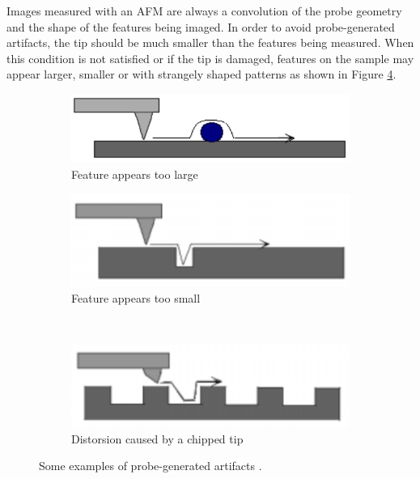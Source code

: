 \documentclass[11pt,a4paper]{article}
\begin{document}
Images measured with an AFM are always a convolution of the probe geometry and the shape of the features being imaged. In order to avoid probe-generated artifacts, the tip should be much smaller than the features being measured. When this condition is not satisfied or if the tip is damaged, features on the sample may appear larger, smaller or with strangely shaped patterns as shown in Figure \ref{fig:artifacts_probe}.

\begin{figure}[H]
\centering
\begin{subfigure}[b]{0.45\textwidth}
\includegraphics[width=\textwidth]{artifacts_probe_1}
\caption{Feature appears too large}
\label{fig:artifacts_probe_1}
\end{subfigure}
\begin{subfigure}[b]{0.45\textwidth}
\includegraphics[width=\textwidth]{artifacts_probe_2}
\caption{Feature appears too small}
\label{fig:artifacts_probe_2}
\end{subfigure}\\\vspace{.2cm}
\begin{subfigure}[b]{0.45\textwidth}
\includegraphics[width=\textwidth]{artifacts_probe_3}
\caption{Distorsion caused by a chipped tip}
\label{fig:artifacts_probe_3}
\end{subfigure}
\caption{Some examples of probe-generated artifacts \cite{artifacts}.}
\label{fig:artifacts_probe}
\end{figure}
\end{document}
